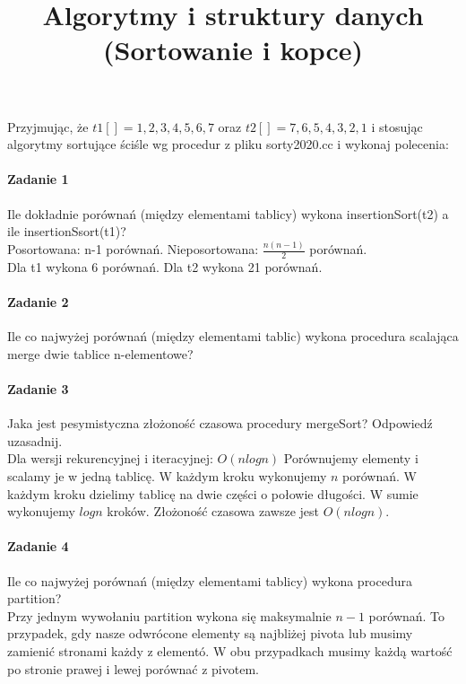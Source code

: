 \documentclass[18pt]{extarticle}
\begin{document}
\large
{}\selectfont

\title{Algorytmy i struktury danych (Sortowanie i kopce)}
\date{}
\maketitle

Przyjmując, że $t1[]={1,2,3,4,5,6,7}$ oraz $t2[]={7,6,5,4,3,2,1}$ i stosując algorytmy sortujące ściśle wg procedur z pliku sorty2020.cc i wykonaj polecenia:

\paragraph{Zadanie 1} Ile dokładnie porównań (między elementami  tablicy) wykona insertionSort(t2) a ile insertionSsort(t1)? \\

Posortowana: n-1 porównań. Nieposortowana: $\frac{n(n-1)}{2}$ porównań. \\
Dla t1 wykona 6 porównań. Dla t2 wykona 21 porównań.

\paragraph{Zadanie 2} Ile co najwyżej porównań (między elementami tablic) wykona procedura scalająca merge dwie tablice n-elementowe? \\


\paragraph{Zadanie 3} Jaka jest pesymistyczna złożoność czasowa procedury mergeSort? Odpowiedź uzasadnij. \\


Dla wersji rekurencyjnej i iteracyjnej: $O(nlogn)$ 
Porównujemy elementy i scalamy je w jedną tablicę. W każdym kroku wykonujemy $n$ porównań. W każdym kroku dzielimy tablicę na dwie części o połowie długości. W sumie wykonujemy $logn$ kroków. Złożoność czasowa zawsze jest $O(nlogn)$.

\paragraph{Zadanie 4} Ile co najwyżej porównań (między elementami tablicy) wykona procedura partition? \\


Przy jednym wywołaniu partition wykona się maksymalnie $n-1$ porównań. To przypadek, gdy nasze odwrócone elementy są najbliżej pivota lub musimy zamienić stronami każdy z elementó. W obu przypadkach musimy każdą wartość po stronie prawej i lewej porównać z pivotem.
\end{document}
